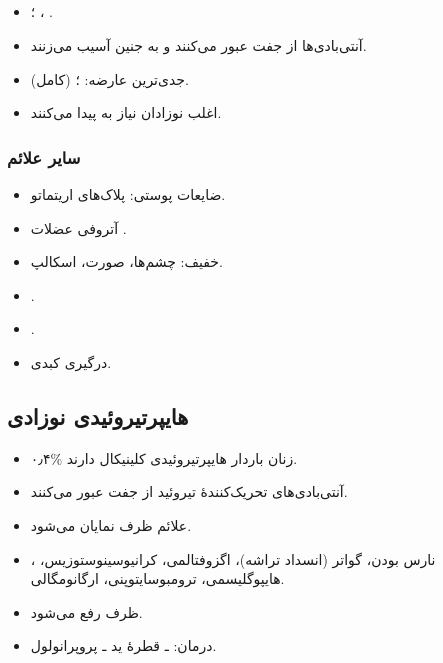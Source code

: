 \documentclass[12pt,a4paper]{article}
\begin{document}
\subsection*{}
\begin{itemize}
  \item {}؛ ، .
  \item آنتی‌بادی‌ها از جفت عبور می‌کنند و به جنین آسیب می‌زنند.
  \item جدی‌ترین عارضه: ؛
         (کامل).
  \item اغلب نوزادان نیاز به  پیدا می‌کنند.
\end{itemize}
\subsubsection*{سایر علائم}
\begin{itemize}
  \item ضایعات پوستی: پلاک‌های اریتماتو.
  \item آتروفی عضلات .
  \item {} خفیف: چشم‌ها، صورت، اسکالپ.
  \item {}.
  \item {}.
  \item درگیری کبدی.
\end{itemize}

\subsection*{هایپرتیروئیدی نوزادی}
\begin{itemize}
  \item ۰٫۴\% زنان باردار هایپرتیروئیدی کلینیکال دارند.
  \item آنتی‌بادی‌های تحریک‌کنندهٔ تیروئید از جفت عبور می‌کنند.
  \item علائم ظرف  نمایان می‌شود.
  \item {}، نارس بودن، گواتر (انسداد تراشه)، اگزوفتالمی،
        کرانیوسینوستوزیس، هایپوگلیسمی، ترومبوسایتوپنی، ارگانومگالی.
  \item ظرف  رفع می‌شود.
  \item درمان:  ـ قطرهٔ ید ـ پروپرانولول.
\end{itemize}

\clearpage
\end{document}
